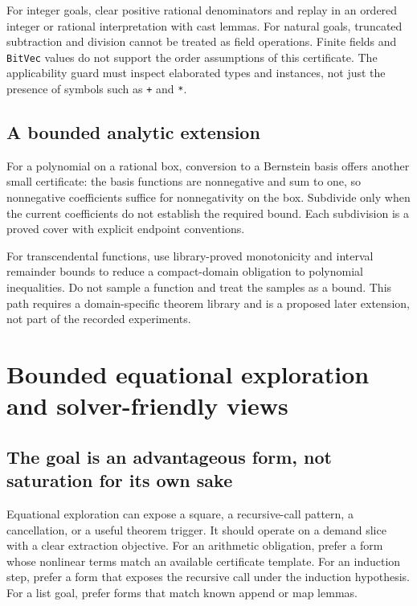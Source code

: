 \documentclass[11pt,a4paper]{article}
\begin{document}
For integer goals, clear positive rational denominators and replay in an ordered integer or rational interpretation with cast lemmas. For natural goals, truncated subtraction and division cannot be treated as field operations. Finite fields and \texttt{BitVec} values do not support the order assumptions of this certificate. The applicability guard must inspect elaborated types and instances, not just the presence of symbols such as \texttt{+} and \texttt{*}.

\subsection{A bounded analytic extension}

For a polynomial on a rational box, conversion to a Bernstein basis offers another small certificate: the basis functions are nonnegative and sum to one, so nonnegative coefficients suffice for nonnegativity on the box. Subdivide only when the current coefficients do not establish the required bound. Each subdivision is a proved cover with explicit endpoint conventions.

For transcendental functions, use library-proved monotonicity and interval remainder bounds to reduce a compact-domain obligation to polynomial inequalities. Do not sample a function and treat the samples as a bound. This path requires a domain-specific theorem library and is a proposed later extension, not part of the recorded experiments.

\section{Bounded equational exploration and solver-friendly views}
\label{sec:eqsat}

\subsection{The goal is an advantageous form, not saturation for its own sake}

Equational exploration can expose a square, a recursive-call pattern, a cancellation, or a useful theorem trigger. It should operate on a demand slice with a clear extraction objective. For an arithmetic obligation, prefer a form whose nonlinear terms match an available certificate template. For an induction step, prefer a form that exposes the recursive call under the induction hypothesis. For a list goal, prefer forms that match known append or map lemmas.
\end{document}
